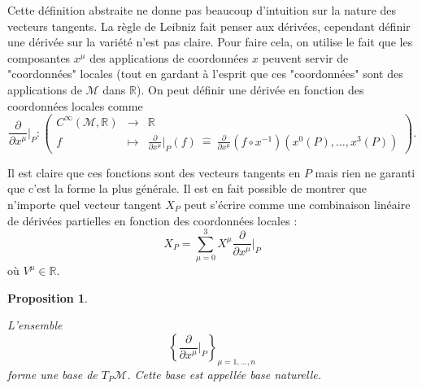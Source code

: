\documentclass[a4paper,11pt]{report}
\theoremstyle{definition}
\theoremstyle{plain}
\newtheorem{prop}[thm]{Proposition}
\theoremstyle{definition}
\theoremstyle{remark}
\newcommand{\M}{\mathscr{M}}
\newcommand{\p}{\partial}
\begin{document}
                Cette définition abstraite ne donne pas beaucoup d'intuition sur la nature des vecteurs tangents. La règle de Leibniz fait penser aux dérivées, cependant définir une dérivée sur la variété n'est pas claire. Pour faire cela, on utilise le fait que les composantes $x^\mu$ des applications de coordonnées $x$ peuvent servir de "coordonnées" locales (tout en gardant à l'esprit que ces "coordonnées" sont des applications de $\M$ dans $\mathbb{R}$). On peut définir une dérivée en fonction des coordonnées locales comme
                \begin{equation}
                \frac{\p}{\p x^\mu}\bigg|_P:\left(
                \begin{array}{ccc}
                    C^\infty(\M,\mathbb{R}) & \longrightarrow & \mathbb{R} \\
                    f & \longmapsto & \frac{\p}{\p x^\mu}\bigg|_P(f) ~\hat{=}~ \frac{\p}{\p x^\mu}(f\circ x^{-1})(x^0(P),\dots,x^3(P))
                \end{array}
                \right).
                \end{equation}
                
                Il est claire que ces fonctions sont des vecteurs tangents en $P$ mais rien ne garanti que c'est la forme la plus générale. Il est en fait possible de montrer que n'importe quel vecteur tangent $X_P$ peut s'écrire comme une combinaison linéaire de dérivées partielles en fonction des coordonnées locales :
                \begin{equation}
                    X_P = \sum_{\mu=0}^3 X^\mu \frac{\p}{\p x^\mu}\bigg|_P
                \end{equation}
                où $V^\mu\in\mathbb{R}$.
                
                \begin{prop}\begin{leftbar}
                    L'ensemble
                    \begin{equation}
                        \left\{ \frac{\p}{\p x^\mu}\bigg|_P \right\}_{\mu=1,\dots,n}
                    \end{equation}
                    forme une base de $T_P\M$. Cette base est appellée \textit{base naturelle}.
                \end{leftbar}\end{prop}
                
\end{document}
